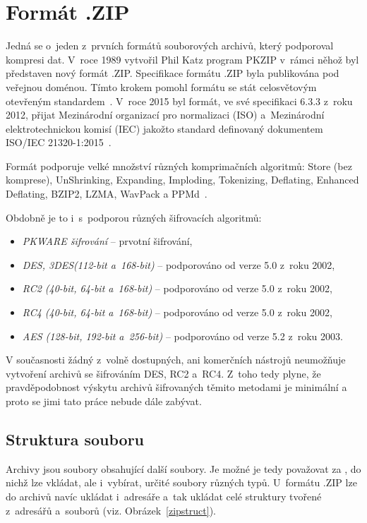 \section{Formát .ZIP}
Jedná se o~jeden z~prvních formátů souborových archivů, který podporoval kompresi dat. V~roce 1989
vytvořil Phil Katz program PKZIP v~rámci něhož byl představen nový formát .ZIP. Specifikace
formátu .ZIP byla publikována pod veřejnou doménou. Tímto krokem pomohl formátu se stát
celosvětovým otevřeným standardem~\cite{PKWARE:2015}. V~roce 2015 byl formát, ve své specifikaci
6.3.3 z~roku 2012, přijat Mezinárodní organizací pro normalizaci (ISO) a~Mezinárodní
elektrotechnickou komisí (IEC) jakožto standard definovaný dokumentem ISO/IEC
21320-1:2015~\cite{ISOIEC:2015}.

 Formát podporuje velké množství různých komprimačních algoritmů: Store (bez komprese),
UnShrinking, Expanding, Imploding, Tokenizing, Deflating, Enhanced Deflating, BZIP2, LZMA, WavPack
a PPMd~\cite{PKWARE:2014}. 

 Obdobně je to i~s~podporou různých šifrovacích algoritmů:
\begin{itemize}
    \item {\it PKWARE šifrování} -- prvotní šifrování,
    \item {\it DES, 3DES(112-bit a~168-bit)} -- podporováno od verze 5.0 z~roku 2002,
    \item {\it RC2 (40-bit, 64-bit a~168-bit)} -- podporováno od verze 5.0 z~roku 2002,
    \item {\it RC4 (40-bit, 64-bit a~168-bit)} -- podporováno od verze 5.0 z~roku 2002,
    \item {\it AES (128-bit, 192-bit a~256-bit)} -- podporováno od verze 5.2 z~roku 2003.
\end{itemize}
V současnosti žádný z~volně dostupných, ani komerčních nástrojů neumožňuje vytvoření archivů se
šifrováním DES, RC2 a~RC4. Z~toho tedy plyne, že pravděpodobnost výskytu archivů šifrovaných těmito
metodami je minimální a proto se jimi tato práce nebude dále zabývat.

\subsection{Struktura souboru}
\label{ssec:zip_struct}
Archivy jsou soubory obsahující další soubory. Je možné je tedy považovat za , do nichž
lze vkládat, ale i~vybírat, určité soubory různých typů. U~formátu .ZIP lze do archivů navíc ukládat
i~adresáře a~tak ukládat celé struktury tvořené z~adresářů a~souborů (viz. Obrázek~\ref{zipstruct}).

